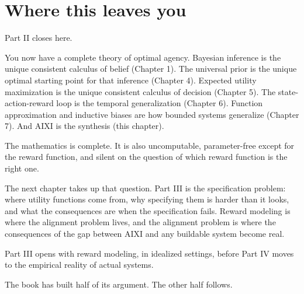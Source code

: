 \section*{Where this leaves you}

Part II closes here.

You now have a complete theory of optimal agency. Bayesian inference is the unique consistent calculus of belief (Chapter 1). The universal prior is the unique optimal starting point for that inference (Chapter 4). Expected utility maximization is the unique consistent calculus of decision (Chapter 5). The state-action-reward loop is the temporal generalization (Chapter 6). Function approximation and inductive biases are how bounded systems generalize (Chapter 7). And AIXI is the synthesis (this chapter).

The mathematics is complete. It is also uncomputable, parameter-free except for the reward function, and silent on the question of which reward function is the right one.

The next chapter takes up that question. Part III is the specification problem: where utility functions come from, why specifying them is harder than it looks, and what the consequences are when the specification fails. Reward modeling is where the alignment problem lives, and the alignment problem is where the consequences of the gap between AIXI and any buildable system become real.

Part III opens with reward modeling, in idealized settings, before Part IV moves to the empirical reality of actual systems.

The book has built half of its argument. The other half follows.
